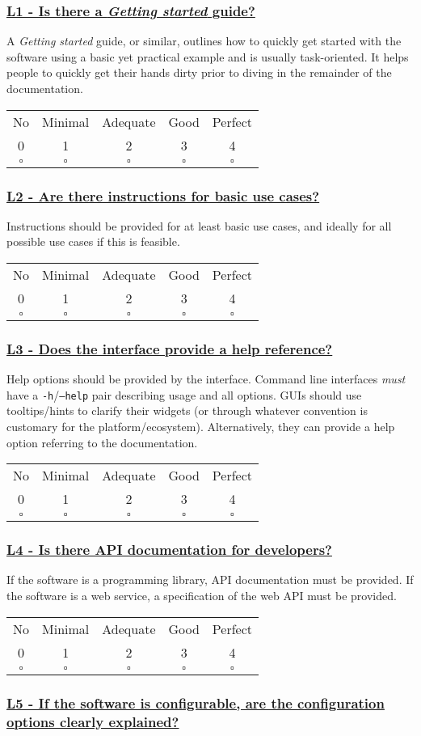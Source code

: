 \documentclass[a4paper,11pt]{article}
\newcommand{\criterion}[2]{\subsubsection*{\underline{#1 - #2}}\label{id:#1}}
\newcommand\CheckTable{%
  \begin{tabular}{ccccc}
    No & Minimal & Adequate & Good & Perfect \\
    0 & 1 & 2 & 3 & 4 \\
    \hline
    $\square$ & $\square$ & $\square$ & $\square$ & $\square$ \\
  \end{tabular}%
}
\begin{document}
\newcommand{\lOneID}{L1}
\newcommand{\lOneText}{Is there a \textit{Getting started} guide?}
\criterion{\lOneID}{\lOneText}

A \textit{Getting started} guide, or similar, outlines how to quickly get
started with the software using a basic yet practical example and is usually task-oriented.
It helps people to quickly get their hands dirty prior to diving in the
remainder of the documentation. 

\CheckTable

\newcommand{\lTwoID}{L2}
\newcommand{\lTwoText}{Are there instructions for basic use cases?}
\criterion{\lTwoID}{\lTwoText}

Instructions should be provided for at least basic use cases, and ideally for
all possible use cases if this is feasible.

%
%
%

\CheckTable

\newcommand{\lThreeID}{L3}
\newcommand{\lThreeText}{Does the interface provide a help reference?}
\criterion{\lThreeID}{\lThreeText}

Help options should be provided by the interface. Command line interfaces
\emph{must} have a \texttt{-h}/\texttt{--help} pair describing usage and all options. GUIs should use tooltips/hints to clarify
their widgets (or through whatever convention is customary for the
platform/ecosystem). Alternatively, they can provide a help option referring to
the documentation.

\CheckTable

\newcommand{\lFourID}{L4}
\newcommand{\lFourText}{Is there API documentation for developers?}
\criterion{\lFourID}{\lFourText}

If the software is a programming library, API documentation must be provided.
If the software is a web service, a specification of the web API must be provided.

\CheckTable

\newcommand{\lFiveID}{L5}
\newcommand{\lFiveText}{If the software is configurable, are the configuration options clearly explained?}
\criterion{\lFiveID}{\lFiveText}

%
%
\end{document}
